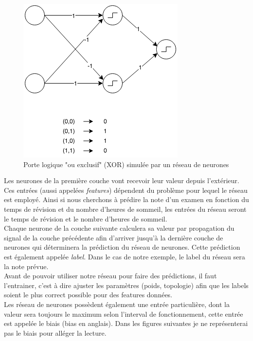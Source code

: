 \documentclass{article}
\begin{document}
\begin{figure}[H]
\begin{center}
	\includegraphics[scale=0.7]{xor.png} 
	\caption{Porte logique "ou exclusif" (XOR) simulée par un réseau de neurones}
\end{center}
\end{figure}

Les neurones de la première couche vont recevoir leur valeur depuis l'extérieur. Ces entrées (aussi appelées \textit{features}) dépendent du problème pour lequel le réseau est employé. Ainsi si nous cherchons à prédire la note d'un examen en fonction du temps de révision et du nombre d'heures de sommeil, les entrées du réseau seront le temps de révision et le nombre d'heures de sommeil.\\
 Chaque neurone de la couche suivante calculera sa valeur par propagation du signal de la couche précédente afin d'arriver jusqu'à la dernière couche de neurones qui déterminera la prédiction du réseau de neurones. Cette prédiction est également appelée \textit{label}. Dans le cas de notre exemple, le label du réseau sera la note prévue.\\
 Avant de pouvoir utiliser notre réseau pour faire des prédictions, il faut l'entrainer, c'est à dire ajuster les paramètres (poids, topologie) afin que les labels soient le plus correct possible pour des features données.\\
 
 Les réseau de neurones possèdent également une entrée particulière, dont la valeur sera toujours le maximum selon l'interval de fonctionnement, cette entrée est appelée le biais (bias en anglais). Dans les figures suivantes je ne représenterai pas le biais pour alléger la lecture.
 
\end{document}

